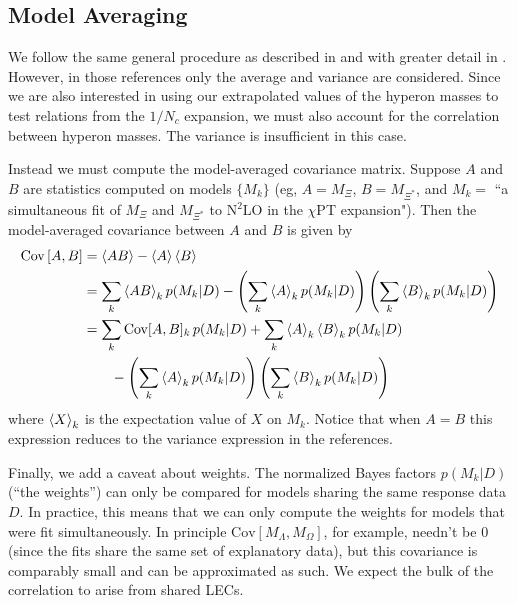 \documentclass[12pt,tightenlines, raggedbottom, prd, notitlepage]{revtex4-1}
\begin{document}
\subsection{Model Averaging}
We follow the same general procedure as described in \cite{Chang:2018uxx,Miller:2020xhy} and with greater detail in \cite{Jay:2020jkz}. However, in those references only the average and variance are considered. Since we are also interested in using our extrapolated values of the hyperon masses to test relations from the $1/N_c$ expansion, we must also account for the correlation between hyperon masses. The variance is insufficient in this case.

Instead we must compute the model-averaged covariance matrix. Suppose $A$ and $B$ are statistics computed on models $\{M_k\}$ (eg, $A=M_\Xi$, $B=M_{\Xi^*}$, and $M_k=$ ``a simultaneous fit of $M_\Xi$ and $M_{\Xi^*}$ to N$^2$LO in the $\chi$PT expansion"). Then the model-averaged covariance between $A$ and $B$ is given by 
\begin{align*}
\text{Cov}\left[A, B\right] &= \braket{AB} - \braket{A}\braket{B} \\ %
&= \sum_k \braket{AB}_k p(M_k | D) 
- \left(  \sum_k \braket{A}_k p(M_k | D) \right) \left(  \sum_k \braket{B}_k p(M_k | D) \right) \\
&= \sum_k \text{Cov}[A,B]_k \, p(M_k | D) 
+ \sum_k \braket{A}_k \braket{B}_k p(M_k | D)\\
&\qquad - \left(  \sum_k \braket{A}_k p(M_k | D) \right) \left(  \sum_k \braket{B}_k p(M_k | D) \right) 
\end{align*}
where $\braket{X}_k$ is the expectation value of $X$ on $M_k$. Notice that when $A=B$ this expression reduces to the variance expression in the references.

Finally, we add a caveat about weights. The normalized Bayes factors $p(M_k | D)$ (``the weights'') can only be compared for models sharing the same response data $D$. In practice, this means that we can only compute the weights for models that were fit simultaneously. In principle $\text{Cov}[M_{\Lambda}, M_{\Omega}]$, for example, needn't be 0 (since the fits share the same set of explanatory data), but this covariance is comparably small and can be approximated as such. We expect the bulk of the correlation to arise from shared LECs.
\end{document}
